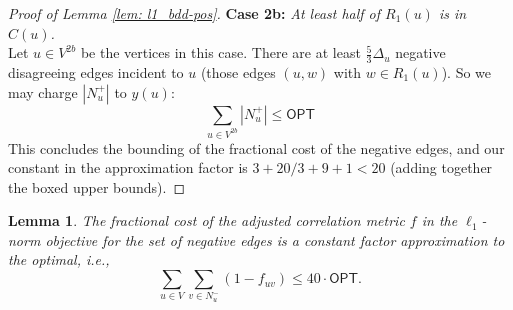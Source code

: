 \documentclass[11pt]{article}
\newtheorem{lemma}{Lemma}
\begin{document}
\begin{proof}[Proof of Lemma \ref{lem: l1_bdd-pos}]
\noindent \textbf{Case 2b:} \emph{At least half of $R_1(u)$ is in $C(u)$.}\\
Let $ u \in  V^{2b}$ be the vertices in this case.
There are at least $\frac{5}{3}\Delta_u$ negative disagreeing edges incident to $u$ (those edges $(u,w)$ with $w \in R_1(u)$). So we may charge $|N_u^+|$ to $y(u)$:
$$\boxed{\sum_{u \in V^{2b}} |N_u^+| \leq  \textsf{OPT}}$$
This concludes the bounding of the fractional cost of the negative edges, 
and our constant in the approximation factor is $3+ 20/3 + 9 + 1 < 20$ (adding together the boxed upper bounds).
\end{proof}

\begin{lemma} \label{lem: l1_bdd-neg}
    The fractional cost of the adjusted correlation metric $f$ in the $\ell_1$-norm objective for the set of negative edges is a constant factor approximation to the optimal, i.e.,
    $$ \sum_{u \in V} \sum_{v \in N_u^-} (1-f_{uv}) \leq 40\cdot \textsf{OPT}.$$
\end{lemma}
\end{document}

